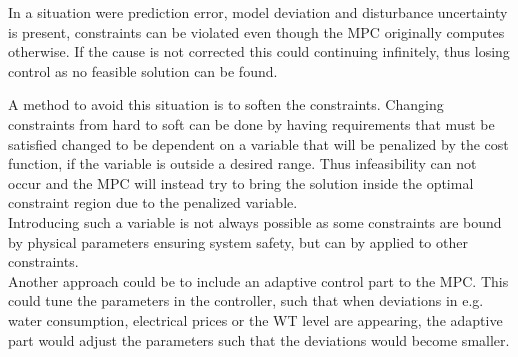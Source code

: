 In a situation were prediction error, model deviation and disturbance uncertainty is present, constraints can be violated even though the MPC originally computes otherwise. If the cause is not corrected this could continuing infinitely, thus losing control as no feasible solution can be found. 

A method to avoid this situation is to soften the constraints. Changing constraints from hard to soft can be done by having requirements that must be satisfied changed to be dependent on a variable that will be penalized by the cost function, if the variable is outside a desired range. Thus infeasibility can not occur and the MPC will instead try to bring the solution inside the optimal constraint region due to the penalized variable.\\   
Introducing such a variable is not always possible as some constraints are bound by physical parameters ensuring system safety, but can by applied to other constraints.\\

Another approach could be to include an adaptive control part to the MPC. This could tune the parameters in the controller, such that when deviations in e.g. water consumption, electrical prices or the WT level are appearing, the adaptive part would adjust the parameters such that the deviations would become smaller.






